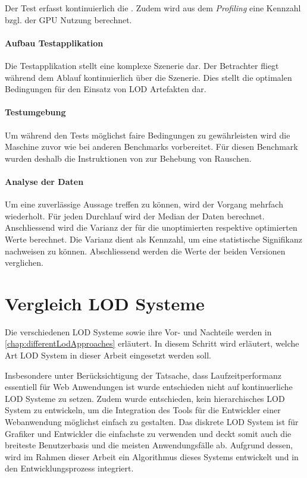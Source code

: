 Der Test erfasst kontinuierlich die . Zudem wird aus dem \emph{Profiling} eine Kennzahl bzgl. der GPU Nutzung berechnet.

\paragraph{Aufbau Testapplikation}
Die Testapplikation stellt eine komplexe Szenerie dar. Der Betrachter fliegt während dem Ablauf kontinuierlich über die Szenerie. Dies stellt die optimalen Bedingungen für den Einsatz von LOD Artefakten dar.

\paragraph{Testumgebung}
Um während den Tests möglichst faire Bedingungen zu gewährleisten wird die Maschine zuvor wie bei anderen Benchmarks vorbereitet. Für diesen Benchmark wurden deshalb die Instruktionen von  zur Behebung von Rauschen.
\cite{tracerBenchNoiseMitigation}

\paragraph{Analyse der Daten}
Um eine zuverlässige Aussage treffen zu können, wird der Vorgang mehrfach wiederholt. Für jeden Durchlauf wird der Median der  Daten berechnet.
Anschliessend wird die Varianz der  für die unoptimierten respektive optimierten Werte berechnet. Die Varianz dient als Kennzahl, um eine statistische Signifikanz nachweisen zu können. Abschliessend werden die Werte der beiden Versionen verglichen.

\section{Vergleich LOD Systeme}
Die verschiedenen LOD Systeme sowie ihre Vor- und Nachteile werden in \autoref{chap:differentLodApproaches} erläutert. In diesem Schritt wird erläutert, welche Art LOD System in dieser Arbeit eingesetzt werden soll.

Insbesondere unter Berücksichtigung der Tatsache, dass Laufzeitperformanz essentiell für Web Anwendungen ist wurde entschieden nicht auf kontinuerliche LOD Systeme zu setzen.
Zudem wurde entschieden, kein hierarchisches LOD System zu entwickeln, um die Integration des Tools für die Entwickler einer Webanwendung möglichst einfach zu gestalten.
Das diskrete LOD System ist für Grafiker und Entwickler die einfachste zu verwenden und deckt somit auch die breiteste Benutzerbasis und die meisten Anwendungsfälle ab. Aufgrund dessen, wird im Rahmen dieser Arbeit ein Algorithmus dieses Systems entwickelt und in den Entwicklungsprozess integriert.

